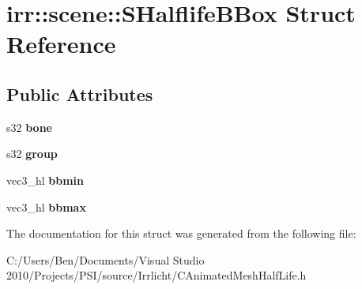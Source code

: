 \hypertarget{structirr_1_1scene_1_1_s_halflife_b_box}{\section{irr\-:\-:scene\-:\-:S\-Halflife\-B\-Box Struct Reference}
\label{structirr_1_1scene_1_1_s_halflife_b_box}
}
\subsection*{Public Attributes}
\begin{DoxyCompactItemize}
\item 
\hypertarget{structirr_1_1scene_1_1_s_halflife_b_box_a8c74466ca3656892cb5a83e32a81a235}{s32 {\bfseries bone}}\label{structirr_1_1scene_1_1_s_halflife_b_box_a8c74466ca3656892cb5a83e32a81a235}

\item 
\hypertarget{structirr_1_1scene_1_1_s_halflife_b_box_a8766211bee893e8d920f541c3554c300}{s32 {\bfseries group}}\label{structirr_1_1scene_1_1_s_halflife_b_box_a8766211bee893e8d920f541c3554c300}

\item 
\hypertarget{structirr_1_1scene_1_1_s_halflife_b_box_a23a49a0b967b62abc874471776dbb2a2}{vec3\-\_\-hl {\bfseries bbmin}}\label{structirr_1_1scene_1_1_s_halflife_b_box_a23a49a0b967b62abc874471776dbb2a2}

\item 
\hypertarget{structirr_1_1scene_1_1_s_halflife_b_box_a2881de67826b875a155dcedcabd0a71c}{vec3\-\_\-hl {\bfseries bbmax}}\label{structirr_1_1scene_1_1_s_halflife_b_box_a2881de67826b875a155dcedcabd0a71c}

\end{DoxyCompactItemize}


The documentation for this struct was generated from the following file\-:\begin{DoxyCompactItemize}
\item 
C\-:/\-Users/\-Ben/\-Documents/\-Visual Studio 2010/\-Projects/\-P\-S\-I/source/\-Irrlicht/C\-Animated\-Mesh\-Half\-Life.\-h\end{DoxyCompactItemize}
